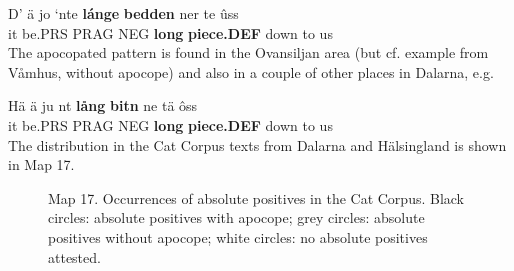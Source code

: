 
\ea\label{}
\gll D’  ä  jo  ‘nte  \textbf{lánge} \textbf{bedden} ner  te  ûss\\
it  be.PRS  PRAG  NEG  \textbf{long} \textbf{piece.DEF} down  to  us\\
\z
The apocopated pattern is found in the Ovansiljan area (but cf. example from Våmhus, without apocope) and also in a couple of other places in Dalarna, e.g.


\ea\label{}
\gll Hä  ä  ju  nt  \textbf{lång} \textbf{bitn} ne  tä  ôss\\
it  be.PRS  PRAG  NEG  \textbf{long} \textbf{piece.DEF} down  to  us\\The distribution in the Cat Corpus texts from Dalarna and Hälsingland is shown in Map 17.
\z 
\begin{figure}[h]

\begin{minipage}{3.67708in}

\label{bkm:Ref160012437}Map 17. Occurrences of absolute positives in the Cat Corpus. Black circles: absolute positives with apocope; grey circles: absolute positives without apocope; white circles: no absolute positives attested.


\end{minipage}

\end{figure}
